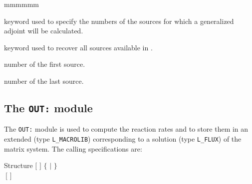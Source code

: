 \begin{ListeDeDescription}{mmmmmm}
\item[\moc{FROM-TO}] keyword used to specify the numbers of the sources for which a generalized adjoint will be calculated.

\item[\moc{ALL}] keyword used to recover all sources available in .

\item[\dusa{$i_{src1}$}] number of the first source.

\item[\dusa{$i_{src1}$}] number of the last source.

\end{ListeDeDescription}
\clearpage

\subsection{The {\tt OUT:} module}

The {\tt OUT:} module is used to compute the reaction rates and to store them in an extended  (type {\tt L\_MACROLIB}) corresponding to a solution (type {\tt L\_FLUX}) of the matrix system. The calling specifications are:

\begin{DataStructure}{Structure }
 \moc{:=}  $[$  $]$    $\{$  $|$   $\}$ \\
\hskip 0.5cm $~[$  $]$ \\
\hskip 0.5cm \moc{::} 
\end{DataStructure}

